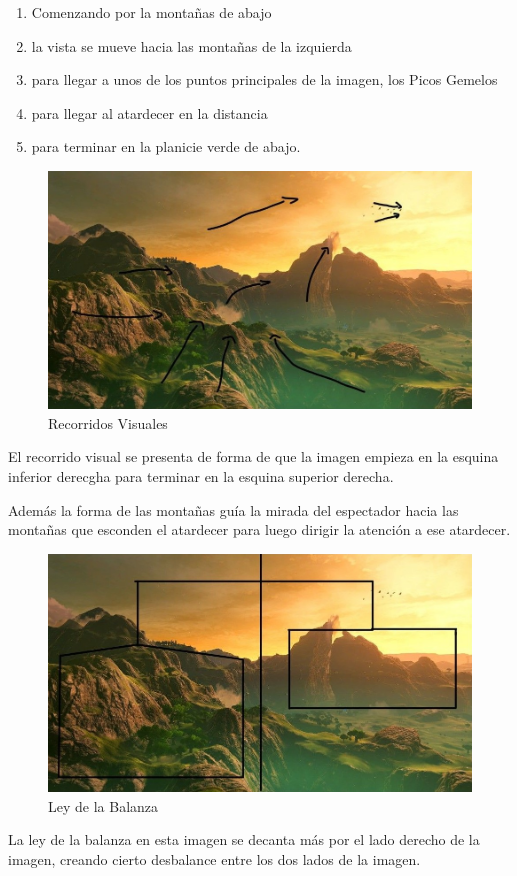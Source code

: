 \documentclass[12pt]{article}
\begin{document}
          \begin{enumerate}
            \item Comenzando por la montañas de abajo 
            \item la vista se mueve hacia las montañas de la izquierda
            \item para llegar a unos de los puntos principales de la imagen, los Picos Gemelos
            \item para llegar al atardecer en la distancia
            \item para terminar en la planicie verde de abajo.
          \end{enumerate}

          \begin{figure}[H]
            \centering
            \includegraphics[width=\textwidth]{Jesus/Seccion16/Fondo2.JPEG}
            \caption{Recorridos Visuales}
          \end{figure}
	          El recorrido visual se presenta de forma de que la imagen empieza en la esquina inferior derecgha para terminar en la esquina superior derecha.

            Además la forma de las montañas guía la mirada del espectador hacia las montañas que esconden el atardecer para luego dirigir la atención a ese atardecer. 
          
          \begin{figure}[H]
            \centering
            \includegraphics[width=\textwidth]{Jesus/Seccion16/Fondo6.JPEG}
            \caption{Ley de la Balanza}
          \end{figure}
            La ley de la balanza en esta imagen se decanta más por el lado derecho de la imagen, creando cierto desbalance entre los dos lados de la imagen. 
            
\end{document}
